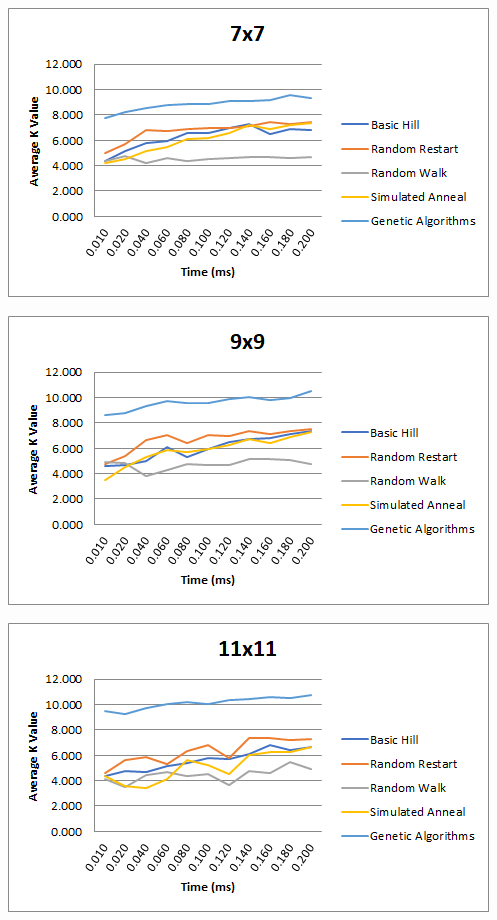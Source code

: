 \documentclass[12pt, letterpaper]{article}
\begin{document}
\includegraphics[width=\linewidth]{"Task 7/7x7 Timeplot"}

\bigskip

\includegraphics[width=\linewidth]{"Task 7/9x9 Timeplot"}

\bigskip

\includegraphics[width=\linewidth]{"Task 7/11x11 Timeplot"}
\end{document}

